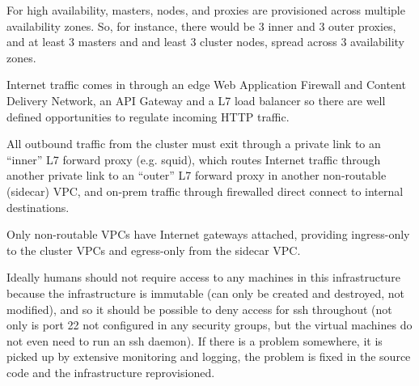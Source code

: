 \documentclass[reprint,amsmath,amssymb,aps]{revtex4-1}
\begin{document}
For high availability, masters, nodes, and proxies are provisioned across multiple availability zones. So, for instance, there would be 3 inner and 3 outer proxies, and at least 3 masters and and least 3 cluster nodes, spread across 3 availability zones.

Internet traffic comes in through an edge Web Application Firewall and Content Delivery Network, an API Gateway and a L7 load balancer so there are well defined opportunities to regulate incoming HTTP traffic.

All outbound traffic from the cluster must exit through a private link to an “inner” L7 forward proxy (e.g. squid), which routes Internet traffic through another private link to an “outer” L7 forward proxy in another non-routable (sidecar) VPC, and on-prem traffic through firewalled direct connect to internal destinations.

Only non-routable VPCs have Internet gateways attached, providing ingress-only to the cluster VPCs and egress-only from the sidecar VPC.

Ideally humans should not require access to any machines in this infrastructure because the infrastructure is immutable (can only be created and destroyed, not modified), and so it should be possible to deny access for ssh throughout (not only is port 22 not configured in any security groups, but the virtual machines do not even need to run an ssh daemon). If there is a problem somewhere, it is picked up by extensive monitoring and logging, the problem is fixed in the source code and the infrastructure reprovisioned.



\end{document}
